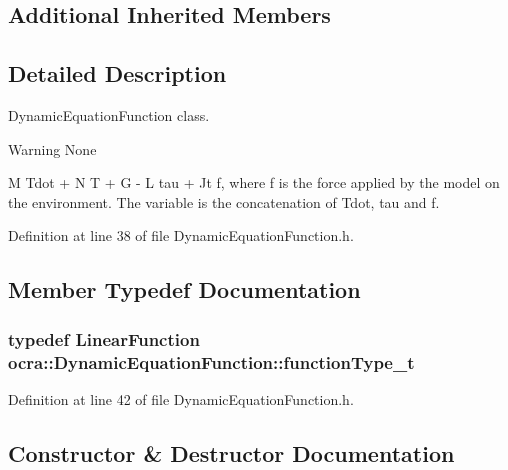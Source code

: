 \subsection*{Additional Inherited Members}


\subsection{Detailed Description}
Dynamic\+Equation\+Function class. 

\begin{DoxyWarning}{Warning}
None
\end{DoxyWarning}
M Tdot + N T + G -\/ L tau + Jt f, where f is the force applied by the model on the environment. The variable is the concatenation of Tdot, tau and f. 

Definition at line 38 of file Dynamic\+Equation\+Function.\+h.



\subsection{Member Typedef Documentation}
\subsubsection[{\texorpdfstring{function\+Type\+\_\+t}{functionType_t}}]{\setlength{\rightskip}{0pt plus 5cm}typedef {\bf Linear\+Function} {\bf ocra\+::\+Dynamic\+Equation\+Function\+::function\+Type\+\_\+t}}\hypertarget{classocra_1_1DynamicEquationFunction_a2c8c76bfd66285d63895ec34219175b4}{}\label{classocra_1_1DynamicEquationFunction_a2c8c76bfd66285d63895ec34219175b4}


Definition at line 42 of file Dynamic\+Equation\+Function.\+h.



\subsection{Constructor \& Destructor Documentation}
